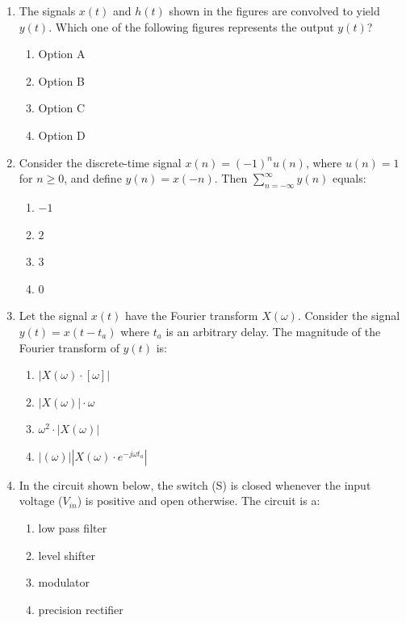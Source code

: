 \documentclass[journal]{IEEEtran}
\begin{document}
\begin{enumerate}
\item The signals $x(t)$ and $h(t)$ shown in the figures are convolved to yield $y(t)$. Which one of the following figures represents the output $y(t)$?

\begin{multicols}{2}
\begin{enumerate}
    \item Option A
    \item Option B
    \item Option C
    \item Option D
\end{enumerate}
\end{multicols}

\item Consider the discrete-time signal $x(n) = (-1)^n u(n)$, where $u(n) = 1$ for $n \geq 0$, and define $y(n) = x(-n)$. Then $\sum_{n=-\infty}^{\infty} y(n)$ equals:

\begin{multicols}{2}
\begin{enumerate}
    \item $-1$
    \item $2$
    \item $3$
    \item $0$
\end{enumerate}
\end{multicols}

\item Let the signal $x(t)$ have the Fourier transform $X(\omega)$. Consider the signal $y(t) = x(t - t_a)$ where $t_a$ is an arbitrary delay. The magnitude of the Fourier transform of $y(t)$ is:

\begin{multicols}{2}
\begin{enumerate}
    \item $|X(\omega) \cdot [\omega]|$
    \item $|X(\omega)| \cdot \omega$
    \item $\omega^2 \cdot |X(\omega)|$
    \item $|(\omega)||X(\omega) \cdot e^{-j\omega t_a}|$
\end{enumerate}
\end{multicols}

\item In the circuit shown below, the switch (S) is closed whenever the input voltage ($V_{in}$) is positive and open otherwise. The circuit is a:

\begin{multicols}{2}
\begin{enumerate}
    \item low pass filter
    \item level shifter
    \item modulator
    \item precision rectifier
\end{enumerate}
\end{multicols}


\end{enumerate}
\end{document}
